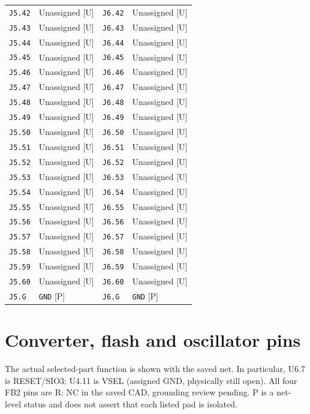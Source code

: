 \documentclass[11pt,a4paper]{article}
\begin{document}
\begin{longtable}{@{}P{27mm}P{55mm}P{27mm}P{55mm}@{}}
\nolinkurl{J5.42} & Unassigned [U] & \nolinkurl{J6.42} & Unassigned [U] \\
\nolinkurl{J5.43} & Unassigned [U] & \nolinkurl{J6.43} & Unassigned [U] \\
\nolinkurl{J5.44} & Unassigned [U] & \nolinkurl{J6.44} & Unassigned [U] \\
\nolinkurl{J5.45} & Unassigned [U] & \nolinkurl{J6.45} & Unassigned [U] \\
\nolinkurl{J5.46} & Unassigned [U] & \nolinkurl{J6.46} & Unassigned [U] \\
\nolinkurl{J5.47} & Unassigned [U] & \nolinkurl{J6.47} & Unassigned [U] \\
\nolinkurl{J5.48} & Unassigned [U] & \nolinkurl{J6.48} & Unassigned [U] \\
\nolinkurl{J5.49} & Unassigned [U] & \nolinkurl{J6.49} & Unassigned [U] \\
\nolinkurl{J5.50} & Unassigned [U] & \nolinkurl{J6.50} & Unassigned [U] \\
\nolinkurl{J5.51} & Unassigned [U] & \nolinkurl{J6.51} & Unassigned [U] \\
\nolinkurl{J5.52} & Unassigned [U] & \nolinkurl{J6.52} & Unassigned [U] \\
\nolinkurl{J5.53} & Unassigned [U] & \nolinkurl{J6.53} & Unassigned [U] \\
\nolinkurl{J5.54} & Unassigned [U] & \nolinkurl{J6.54} & Unassigned [U] \\
\nolinkurl{J5.55} & Unassigned [U] & \nolinkurl{J6.55} & Unassigned [U] \\
\nolinkurl{J5.56} & Unassigned [U] & \nolinkurl{J6.56} & Unassigned [U] \\
\nolinkurl{J5.57} & Unassigned [U] & \nolinkurl{J6.57} & Unassigned [U] \\
\nolinkurl{J5.58} & Unassigned [U] & \nolinkurl{J6.58} & Unassigned [U] \\
\nolinkurl{J5.59} & Unassigned [U] & \nolinkurl{J6.59} & Unassigned [U] \\
\nolinkurl{J5.60} & Unassigned [U] & \nolinkurl{J6.60} & Unassigned [U] \\
\nolinkurl{J5.G} & \nolinkurl{GND} [P] & \nolinkurl{J6.G} & \nolinkurl{GND} [P] \\
\end{longtable}\endgroup

\clearpage\section{Converter, flash and oscillator pins}\label{app:devices}
The actual selected-part function is shown with the saved net. In particular, U6.7 is RESET/SIO3; U4.11 is VSEL (assigned GND, physically still open). All four FB2 pins are R: NC in the saved CAD, grounding review pending. P is a net-level status and does not assert that each listed pad is isolated.
\end{document}
